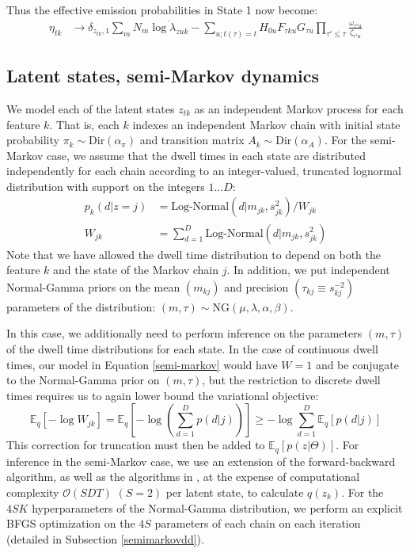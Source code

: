 \documentclass[10pt,letterpaper]{article}
\begin{document}
Thus the effective emission probabilities in State 1 now become:
\begin{align}
    \eta_{tk} &\rightarrow \delta_{z_{tk}, 1} \sum_{m} N_m \overline{\log \lambda_{zuk}}
    - \sum_{u; t(\tau) = t} H_{0u} F_{\tau ku} G_{\tau u} \prod_{\tau' \le \tau} \frac{\omega_{\tau' u}}{\zeta_{\tau' u}}
\end{align}


\subsection{Latent states, semi-Markov dynamics}

We model each of the latent states $z_{tk}$ as an independent Markov process for each feature $k$. That is, each $k$ indexes an independent Markov chain with initial state probability $\pi_k\sim \text{Dir}(\alpha_\pi)$ and transition matrix $A_k\sim \text{Dir}(\alpha_A)$. For the semi-Markov case, we assume that the dwell times in each state are distributed independently for each chain according to an integer-valued, truncated lognormal distribution with support on the integers $1\dots D$:
\begin{align}
    \label{semi-markov}
    p_k(d|z = j) &= \text{Log-Normal}(d|m_{jk}, s^2_{jk}) / W_{jk}  \\
    W_{jk} &= \sum_{d = 1}^D \text{Log-Normal}(d|m_{jk}, s^2_{jk})
\end{align}
Note that we have allowed the dwell time distribution to depend on both the feature $k$ and the state of the Markov chain $j$. In addition, we put independent Normal-Gamma priors on the mean $(m_{kj})$ and precision $(\tau_{kj} \equiv s_{kj}^{-2})$ parameters of the distribution: $(m, \tau) \sim \text{NG}(\mu, \lambda, \alpha, \beta)$.

In this case, we additionally need to perform inference on the parameters $(m, \tau)$ of the dwell time distributions for each state. In the case of continuous dwell times, our model in Equation \ref{semi-markov} would have $W = 1$ and be conjugate to the Normal-Gamma prior on $(m, \tau)$, but the restriction to discrete dwell times requires us to again lower bound the variational objective:
\begin{equation}
    \mathbb{E}_q\left[-\log W_{jk} \right] =
    \mathbb{E}_q\left[- \log \left( \sum_{d=1}^D p(d|j)\right) \right]
    \ge -\log \sum_{d = 1}^D \mathbb{E}_q\left[p(d|j)\right]
\end{equation}
This correction for truncation must then be added to $\mathbb{E}_q[p(z|\Theta)]$. For inference in the semi-Markov case, we use an extension of the forward-backward algorithm\cite{Yu2006-bb}, as well as the algorithms in \cite{Mitchell1993-sl, Mitchell1995-go}, at the expense of computational complexity $\mathcal{O}(SDT)$ $(S = 2)$ per latent state, to calculate $q(z_k)$. For the $4SK$ hyperparameters of the Normal-Gamma distribution, we perform an explicit BFGS optimization on the $4S$ parameters of each chain on each iteration (detailed in Subsection \ref{semimarkovdd}).
\end{document}
